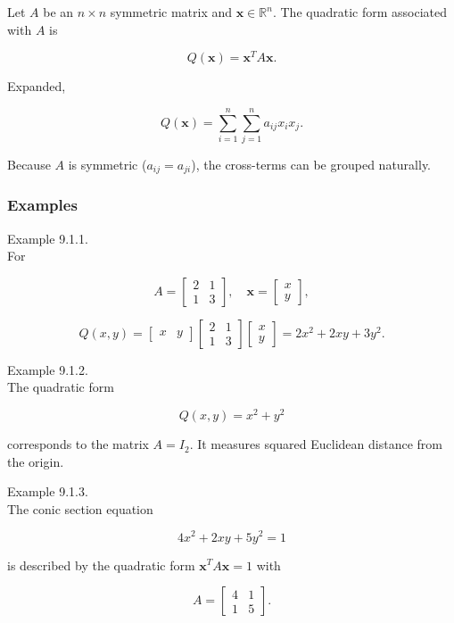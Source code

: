 \documentclass[
  12pt,
  a4paper,
]{article}
\begin{document}
Let \(A\) be an \(n \times n\) symmetric matrix and
\(\mathbf{x} \in \mathbb{R}^n\). The quadratic form associated with
\(A\) is

\[Q(\mathbf{x}) = \mathbf{x}^T A \mathbf{x}.\]

Expanded,

\[Q(\mathbf{x}) = \sum_{i=1}^n \sum_{j=1}^n a_{ij} x_i x_j.\]

Because \(A\) is symmetric (\(a_{ij} = a_{ji}\)), the cross-terms can be
grouped naturally.

\subsubsection{Examples}\label{examples-9}

Example 9.1.1.\\
For

\[A = \begin{bmatrix}
2 & 1 \\
1 & 3 \end{bmatrix}, \quad \mathbf{x} = \begin{bmatrix}
x \\
y \end{bmatrix},\]

\[Q(x,y) = \begin{bmatrix} x & y \end{bmatrix}
\begin{bmatrix}
2 & 1 \\
1 & 3 \end{bmatrix}
\begin{bmatrix}
x \\
y \end{bmatrix}
= 2x^2 + 2xy + 3y^2.\]

Example 9.1.2.\\
The quadratic form

\[Q(x,y) = x^2 + y^2\]

corresponds to the matrix \(A = I_2\). It measures squared Euclidean
distance from the origin.

Example 9.1.3.\\
The conic section equation

\[4x^2 + 2xy + 5y^2 = 1\]

is described by the quadratic form \(\mathbf{x}^T A \mathbf{x} = 1\)
with

\[A = \begin{bmatrix}
4 & 1 \\
1 & 5
\end{bmatrix}.\]
\end{document}
